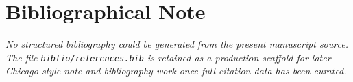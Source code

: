 \chapter*{Bibliographical Note}

\noindent\textit{No structured bibliography could be generated from the present manuscript source. The file \texttt{biblio/references.bib} is retained as a production scaffold for later Chicago-style note-and-bibliography work once full citation data has been curated.}
